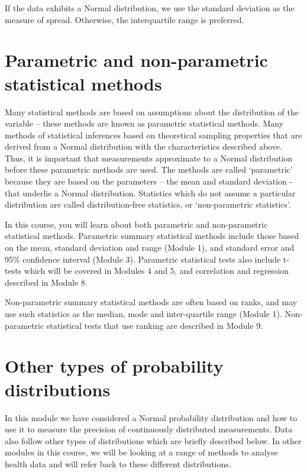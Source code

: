 \documentclass[
]{memoir}
\begin{document}
If the data exhibits a Normal distribution, we use the standard deviation as the measure of spread. Otherwise, the interquartile range is preferred.

\hypertarget{parametric-and-non-parametric-statistical-methods}{%
\section{Parametric and non-parametric statistical methods}\label{parametric-and-non-parametric-statistical-methods}}

Many statistical methods are based on assumptions about the distribution of the variable -- these methods are known as parametric statistical methods. Many methods of statistical inferences based on theoretical sampling properties that are derived from a Normal distribution with the characteristics described above. Thus, it is important that measurements approximate to a Normal distribution before these parametric methods are used. The methods are called `parametric' because they are based on the parameters -- the mean and standard deviation - that underlie a Normal distribution. Statistics which do not assume a particular distribution are called distribution-free statistics, or `non-parametric statistics'.

In this course, you will learn about both parametric and non-parametric statistical methods. Parametric summary statistical methods include those based on the mean, standard deviation and range (Module 1), and standard error and 95\% confidence interval (Module 3). Parametric statistical tests also include t-tests which will be covered in Modules 4 and 5, and correlation and regression described in Module 8.

Non-parametric summary statistical methods are often based on ranks, and may use such statistics as the median, mode and inter-quartile range (Module 1). Non-parametric statistical tests that use ranking are described in Module 9.

\hypertarget{other-types-of-probability-distributions}{%
\section{Other types of probability distributions}\label{other-types-of-probability-distributions}}

In this module we have considered a Normal probability distribution and how to use it to measure the precision of continuously distributed measurements. Data also follow other types of distributions which are briefly described below. In other modules in this course, we will be looking at a range of methods to analyse health data and will refer back to these different distributions.
\end{document}
